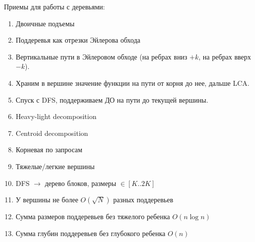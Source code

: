 Приемы для работы с деревьями:
\begin{enumerate}
	\setlength\itemsep{0em}
	\item Двоичные подъемы
	\item Поддеревья как отрезки Эйлерова обхода
	\item Вертикальные пути в Эйлеровом обходе (на ребрах вниз $+k$, на ребрах вверх $-k$).
	\item Храним в вершине значение функции на пути от корня до нее, дальше LCA.
	\item Спуск с DFS, поддерживаем ДО на пути до текущей вершины.
	\item Heavy-light decomposition
	\item Centroid decomposition
	\item Корневая по запросам
	\item Тяжелые/легкие вершины
	\item DFS $\rightarrow$ дерево блоков, размеры $\in [K..2K]$
	\item У вершины не более $O(\sqrt{N})$ разных поддеревьев 
	\item Сумма размеров поддеревьев без тяжелого ребенка $O(n\log{n})$
	\item Сумма глубин поддеревьев без глубокого ребенка $O(n)$
\end{enumerate}

